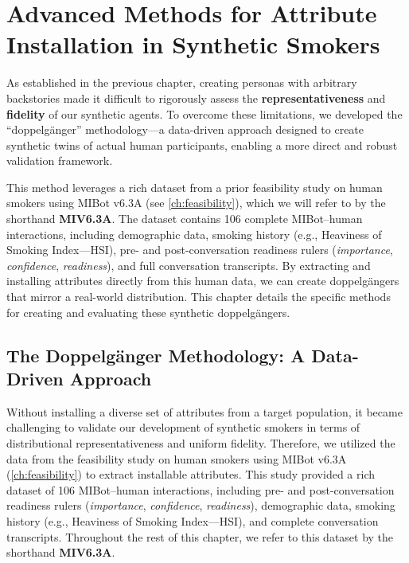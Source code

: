 \chapter{Advanced Methods for Attribute Installation in Synthetic Smokers}
\label{ch:synthetic-doppelganger}

As established in the previous chapter, creating personas with arbitrary backstories made it difficult to rigorously assess the \textbf{representativeness} and \textbf{fidelity} of our synthetic agents. To overcome these limitations, we developed the ``doppelgänger'' methodology---a data-driven approach designed to create synthetic twins of actual human participants, enabling a more direct and robust validation framework.

This method leverages a rich dataset from a prior feasibility study on human smokers using MIBot v6.3A (see \cref{ch:feasibility}), which we will refer to by the shorthand \textbf{MIV6.3A}. The dataset contains 106 complete MIBot--human interactions, including demographic data, smoking history (e.g., Heaviness of Smoking Index---HSI), pre- and post-conversation readiness rulers (\emph{importance}, \emph{confidence}, \emph{readiness}), and full conversation transcripts. By extracting and installing attributes directly from this human data, we can create doppelgängers that mirror a real-world distribution. This chapter details the specific methods for creating and evaluating these synthetic doppelgängers.

\section{The Doppelgänger Methodology: A Data-Driven Approach}
\label{sec:synthetic-smoker-doppelgänger}


Without installing a diverse set of attributes from a target population, it became challenging to validate our development of synthetic smokers in terms of distributional representativeness and uniform fidelity. 
Therefore, we utilized the data from the feasibility study on human smokers using MIBot v6.3A (\cref{ch:feasibility}) to extract installable attributes. This study provided a rich dataset of 106 MIBot--human interactions, including pre- and post-conversation readiness rulers (\emph{importance}, \emph{confidence}, \emph{readiness}), demographic data, smoking history (e.g., Heaviness of Smoking Index---HSI), and complete conversation transcripts. Throughout the rest of this chapter, we refer to this dataset by the shorthand \textbf{MIV6.3A}.

